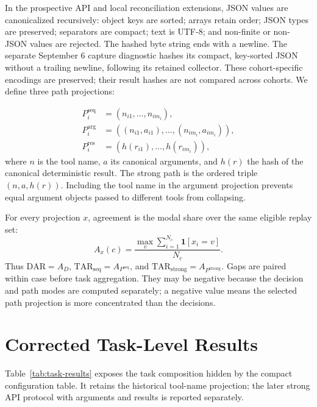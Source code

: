 \documentclass{article}
\newcommand{\dar}{\mathrm{DAR}}
\newcommand{\tarseq}{\mathrm{TAR}_{\mathrm{seq}}}
\newcommand{\tarstrong}{\mathrm{TAR}_{\mathrm{strong}}}
\begin{document}
In the prospective API and local reconciliation extensions, JSON values are
canonicalized recursively: object keys are sorted;
arrays retain order; JSON types are preserved; separators are compact; text is
UTF-8; and non-finite or non-JSON values are rejected.  The hashed byte string
ends with a newline. The separate September 6 capture diagnostic hashes its
compact, key-sorted JSON without a trailing newline, following its retained
collector. These cohort-specific encodings are preserved; their result hashes
are not compared across cohorts. We define three path projections:

\begin{align}
P^{\mathrm{seq}}_i
  &= (n_{i1},\ldots,n_{im_i}),\\
P^{\mathrm{arg}}_i
  &= ((n_{i1},a_{i1}),\ldots,(n_{im_i},a_{im_i})),\\
P^{\mathrm{res}}_i
  &= (h(r_{i1}),\ldots,h(r_{im_i})),
\end{align}
where \(n\) is the tool name, \(a\) its canonical arguments, and \(h(r)\) the
hash of the canonical deterministic result.  The strong path is the ordered
triple \((n,a,h(r))\).  Including the tool name in the argument projection
prevents equal argument objects passed to different tools from collapsing.

For every projection \(x\), agreement is the modal share over the same
eligible replay set:
\[
  A_x(c)=\frac{\max_v\sum_{i=1}^{N_c}\mathbf{1}[x_i=v]}{N_c}.
\]
Thus \(\dar=A_D\), \(\tarseq=A_{P^{\mathrm{seq}}}\), and
\(\tarstrong=A_{P^{\mathrm{strong}}}\).  Gaps are paired within case before
task aggregation.  They may be negative because the decision and path modes
are computed separately; a negative value means the selected path projection
is more concentrated than the decisions.

\section{Corrected Task-Level Results}
\label{app:task-results}

Table~\ref{tab:task-results} exposes the task composition hidden by the compact
configuration table.  It retains the historical tool-name projection; the
later strong API protocol with arguments and results is reported separately.
\end{document}
